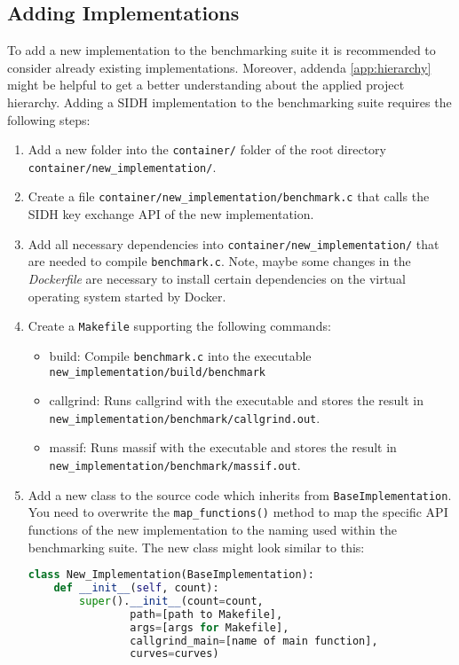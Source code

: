 \subsection{Adding Implementations}\label{sec:benchmarks_details_add}
To add a new implementation to the benchmarking suite it is recommended to consider already existing implementations. Moreover, addenda \ref{app:hierarchy} might be helpful to get a better understanding about the applied project hierarchy. Adding a \gls{SIDH} implementation to the benchmarking suite requires the following steps:
\begin{enumerate}
\itemsep0em 
\item Add a new folder into the \texttt{container/} folder of the root directory \\ \texttt{container/new\_implementation/}.
\item Create a file \texttt{container/new\_implementation/benchmark.c} that calls the \gls{SIDH} key exchange API of the new implementation.
\item Add all necessary dependencies into \texttt{container/new\_implementation/} that are needed to compile \texttt{benchmark.c}. Note, maybe some changes in the \textit{Dockerfile} are necessary to install certain dependencies on the virtual operating system started by Docker.
\item Create a \texttt{Makefile} supporting the following commands:
	\begin{itemize}
		\item build: Compile \texttt{benchmark.c} into the executable \\ \texttt{new\_implementation/build/benchmark}
		\item callgrind: Runs callgrind with the executable and stores the result in\\ \texttt{new\_implementation/benchmark/callgrind.out}.
		\item massif: Runs massif with the executable and stores the result in\\ \texttt{new\_implementation/benchmark/massif.out}.
	\end{itemize}
\item Add a new class to the source code which inherits from \texttt{BaseImplementation}. You need to overwrite the \texttt{map\_functions()} method to map the specific API functions of the new implementation to the naming used within the benchmarking suite. The new class might look similar to this:

\begin{lstlisting}[language=Python]
class New_Implementation(BaseImplementation):
    def __init__(self, count):
        super().__init__(count=count,
				path=[path to Makefile], 
				args=[args for Makefile],
				callgrind_main=[name of main function],
				curves=curves)


\end{lstlisting}
\end{enumerate}
